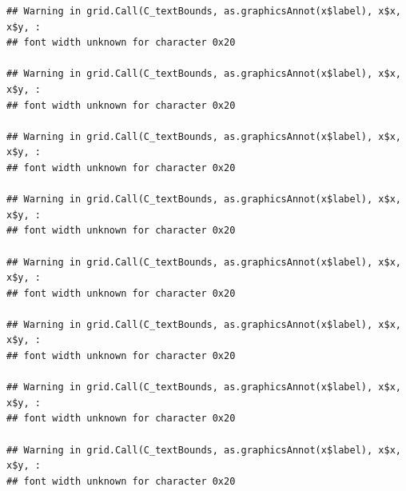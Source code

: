 \documentclass[]{article}
\theoremstyle{definition}
\theoremstyle{definition}
\theoremstyle{definition}
\theoremstyle{remark}
\begin{document}
\begin{verbatim}
## Warning in grid.Call(C_textBounds, as.graphicsAnnot(x$label), x$x, x$y, :
## font width unknown for character 0x20

## Warning in grid.Call(C_textBounds, as.graphicsAnnot(x$label), x$x, x$y, :
## font width unknown for character 0x20

## Warning in grid.Call(C_textBounds, as.graphicsAnnot(x$label), x$x, x$y, :
## font width unknown for character 0x20

## Warning in grid.Call(C_textBounds, as.graphicsAnnot(x$label), x$x, x$y, :
## font width unknown for character 0x20

## Warning in grid.Call(C_textBounds, as.graphicsAnnot(x$label), x$x, x$y, :
## font width unknown for character 0x20

## Warning in grid.Call(C_textBounds, as.graphicsAnnot(x$label), x$x, x$y, :
## font width unknown for character 0x20

## Warning in grid.Call(C_textBounds, as.graphicsAnnot(x$label), x$x, x$y, :
## font width unknown for character 0x20

## Warning in grid.Call(C_textBounds, as.graphicsAnnot(x$label), x$x, x$y, :
## font width unknown for character 0x20
\end{verbatim}
\end{document}
